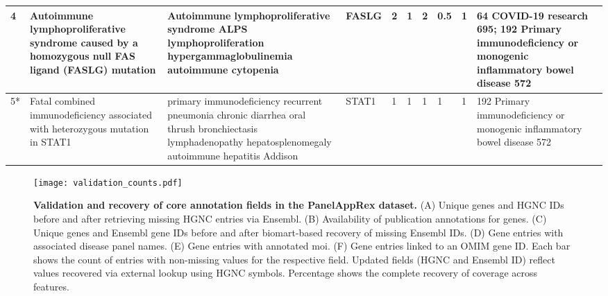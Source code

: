 \begin{table}[htbp]
{\begin{tabular}{|
    p{1cm}|
    p{4cm}|
    p{4cm}|
    p{1.4cm}|
    p{1.3cm}|
    p{1.3cm}|
    p{1.3cm}|
    p{1.3cm}|
    p{1.3cm}|
    p{5cm}|}
\hline																			
4	\cite{magerus-chatinet_autoimmune_2013}	 & 	Autoimmune lymphoproliferative syndrome caused by a homozygous null FAS ligand (FASLG) mutation	 & 	Autoimmune lymphoproliferative syndrome ALPS lymphoproliferation hypergammaglobulinemia autoimmune cytopenia	 & 	FASLG	 & 	2	 & 	1	 & 	2	 & 	0.5	 & 	1	 & 	64 COVID-19 research 695; 192 Primary immunodeficiency or monogenic inflammatory bowel disease 572 \\
\hline																			
5*	\cite{sharfe_fatal_2014}	 & 	Fatal combined immunodeficiency associated with heterozygous mutation in STAT1	 & 	primary immunodeficiency recurrent pneumonia chronic diarrhea oral thrush bronchiectasis lymphadenopathy hepatosplenomegaly autoimmune hepatitis Addison	 & 	STAT1	 & 	1	 & 	1	 & 	1	 & 	1	 & 	1	 & 	192 Primary immunodeficiency or monogenic inflammatory bowel disease 572 \\
\hline
\end{tabular}
}
\end{table}





\begin{figure}[ht]
    \centering
    \texttt{[image: validation\_counts.pdf]}
\caption{\textbf{Validation and recovery of core annotation fields in the PanelAppRex dataset.}
(A) Unique genes and HGNC IDs before and after retrieving missing HGNC entries via Ensembl.
(B) Availability of publication annotations for genes.
(C) Unique genes and Ensembl gene IDs before and after biomart-based recovery of missing Ensembl IDs.
(D) Gene entries with associated disease panel names.
(E) Gene entries with annotated \ac{moi}.
(F) Gene entries linked to an OMIM gene ID.
Each bar shows the count of entries with non-missing values for the respective field. Updated fields (HGNC and Ensembl ID) reflect values recovered via external lookup using HGNC symbols. Percentage shows the complete recovery of coverage across features.
}
    \label{fig:validation}
\end{figure}




















